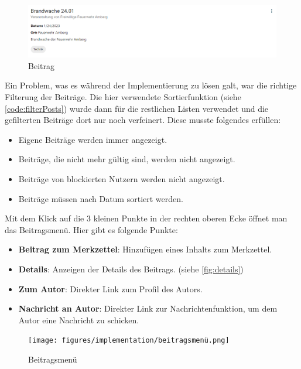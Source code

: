 \begin{figure}[ht!]
  \begin{centering}
    \includegraphics[width=.8\textwidth]{figures/implementation/beitrag.png}
    \caption{Beitrag}
    \label{fig:beitrag}
  \end{centering}
\end{figure}

Ein Problem, was es während der Implementierung zu lösen galt, war die richtige Filterung der Beiträge. Die hier verwendete Sortierfunktion (siehe \ref{code:filterPosts}) wurde dann für die restlichen Listen verwendet und die gefilterten Beiträge dort nur noch verfeinert.
Diese musste folgendes erfüllen:

\begin{itemize}
  \item Eigene Beiträge werden immer angezeigt.
  \item Beiträge, die nicht mehr gültig sind, werden nicht angezeigt.
  \item Beiträge von blockierten Nutzern werden nicht angezeigt.
  \item Beiträge müssen nach Datum sortiert werden.
\end{itemize}

Mit dem Klick auf die 3 kleinen Punkte in der rechten oberen Ecke öffnet man das Beitragsmenü. Hier gibt es folgende Punkte:

\begin{itemize}
  \item \textbf{Beitrag zum Merkzettel}: Hinzufügen eines Inhalts zum Merkzettel.
  \item \textbf{Details}: Anzeigen der Details des Beitrags. (siehe \ref{fig:details})
  \item \textbf{Zum Autor}: Direkter Link zum Profil des Autors.
  \item \textbf{Nachricht an Autor}: Direkter Link zur Nachrichtenfunktion, um dem Autor eine Nachricht zu schicken.
\end{itemize}

\begin{figure}[ht!]
  \begin{centering}
    \texttt{[image: figures/implementation/beitragsmenü.png]}
    \caption{Beitragsmenü}
    \label{fig:beitragsmenü}
  \end{centering}
\end{figure}

